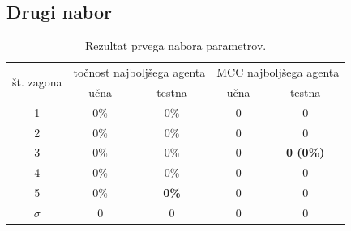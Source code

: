 \subsection{Drugi nabor}\label{subsec:dodatek-statlog-drugi-nabor}
\begin{table}[H]
    \begin{center}
        \begin{tabular}{|| c | c c || c c ||}
            \hline
            \multirow{2}{*}{št. zagona} & \multicolumn{2}{c||}{točnost najboljšega agenta} & \multicolumn{2}{c||}{MCC najboljšega agenta} \\ \cline{2-5}
            & učna & testna       & učna & testna           \\
            \hline
            1        & 0\%  & 0\%          & 0    & 0                \\
            \hline
            2        & 0\%  & 0\%          & 0    & 0                \\
            \hline
            3        & 0\%  & 0\%          & 0    & \textbf{0 (0\%)} \\
            \hline
            4        & 0\%  & 0\%          & 0    & 0                \\
            \hline
            5        & 0\%  & \textbf{0\%} & 0    & 0                \\
            \hline
            $\sigma$ & 0    & 0            & 0    & 0                \\
            \hline
        \end{tabular}
    \end{center}
    \caption{Rezultat prvega nabora parametrov.}
    \label{tab:statlog_result_2}
\end{table}
